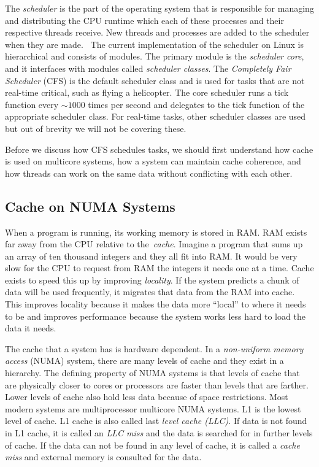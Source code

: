 \documentclass{sig-alternate}
\begin{document}
The \emph{scheduler} is the part of the operating system that is responsible for managing and distributing the CPU runtime which each of these processes and their respective threads receive. New threads and processes are added to the scheduler when they are made.~\cite{Lozi:2016} The current implementation of the scheduler on Linux is hierarchical and consists of modules. The primary module is the \emph{scheduler core}, and it interfaces with modules called \emph{scheduler classes}. The \emph{Completely Fair Scheduler} (CFS) is the default scheduler class and is used for tasks that are not real-time critical, such as flying a helicopter. The core scheduler runs a tick function every ${\sim}1000$ times per second and delegates to the tick function of the appropriate scheduler class. For real-time tasks, other scheduler classes are used but out of brevity we will not be covering these.~\cite{SchedThesis}

Before we discuss how CFS schedules tasks, we should first understand how cache is used on multicore systems, how a system can maintain cache coherence, and how threads can work on the same data without conflicting with each other.

\pagebreak

\subsection{Cache on NUMA Systems}
\label{sec:cache}

When a program is running, its working memory is stored in RAM. RAM exists far away from the CPU relative to the~\emph{cache}. Imagine a program that sums up an array of ten thousand integers and they all fit into RAM. It would be very slow for the CPU to request from RAM the integers it needs one at a time. Cache exists to speed this up by improving \emph{locality}. If the system predicts a chunk of data will be used frequently, it migrates that data from the RAM into cache. This improves locality because it makes the data more ``local'' to where it needs to be and improves performance because the system works less hard to load the data it needs.

The cache that a system has is hardware dependent. In a \emph{non-uniform memory access} (NUMA) system, there are many levels of cache and they exist in a hierarchy. The defining property of NUMA systems is that levels of cache that are physically closer to cores or processors are faster than levels that are farther. Lower levels of cache also hold less data because of space restrictions. Most modern systems are multiprocessor multicore NUMA systems. L1 is the lowest level of cache. L1 cache is also called last \emph{level cache (LLC)}. If data is not found in L1 cache, it is called an \emph{LLC miss} and the data is searched for in further levels of cache. If the data can not be found in any level of cache, it is called a \emph{cache miss} and external memory is consulted for the data. 
\end{document}
